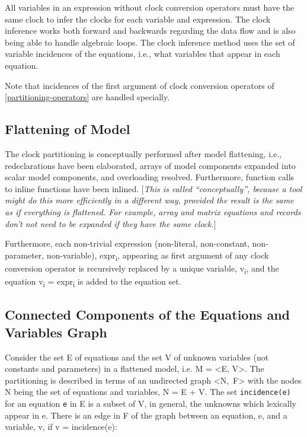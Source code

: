 All variables in an expression without clock conversion operators must
have the same clock to infer the clocks for each variable and
expression. The clock inference works both forward and backwards
regarding the data flow and is also being able to handle algebraic
loops. The clock inference method uses the set of variable incidences of
the equations, i.e., what variables that appear in each equation.

Note that incidences of the first argument of clock conversion operators
of \autoref{partitioning-operators} are handled specially.

\subsection{Flattening of Model}

The clock partitioning is conceptually performed after model flattening,
i.e., redeclarations have been elaborated, arrays of model components
expanded into scalar model components, and overloading resolved.
Furthermore, function calls to inline functions have been inlined.
{[}\emph{This is called ``conceptually'', because a tool might do this
more efficiently in a different way, provided the result is the same as
if everything is flattened. For example, array and matrix equations and
records don't not need to be expanded if they have the same clock.}{]}

Furthermore, each non-trivial expression (non-literal, non-constant,
non-parameter, non-variable), expr\textsubscript{i}, appearing as first
argument of any clock conversion operator is recursively replaced by a
unique variable, v\textsubscript{i}, and the equation v\textsubscript{i}
= expr\textsubscript{i} is added to the equation set.

\subsection{Connected Components of the Equations and Variables Graph}

Consider the set E of equations and the set V of unknown variables (not
constants and parameters) in a flattened model, i.e. M = \textless{}E,
V\textgreater{}. The partitioning is described in terms of an undirected
graph \textless{}N,~F\textgreater{} with the nodes N being the set of
equations and variables, N = E + V. The set \lstinline[basicstyle=\ttfamily]!incidence(e)! for an equation
\lstinline[basicstyle=\ttfamily]!e! in E is a subset of V, in general, the unknowns which lexically appear
in e. There is an edge in F of the graph between an equation, e, and a
variable, v, if v = incidence(e):

